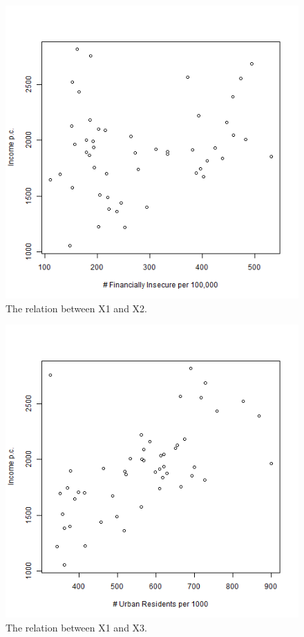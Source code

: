 \documentclass[12pt,letterpaper]{article}
\begin{document}
\begin{figure}[h!]\centering
	\caption{\footnotesize The relation between X1 and X2.}
	\label{fig:plot_4}
	\includegraphics[width=1\textwidth]{X1_X2.png}
\end{figure}

\begin{figure}[h!]\centering
	\caption{\footnotesize The relation between X1 and X3.}
	\label{fig:plot_5}
	\includegraphics[width=1\textwidth]{X1_X3.png}
\end{figure}
\end{document}
